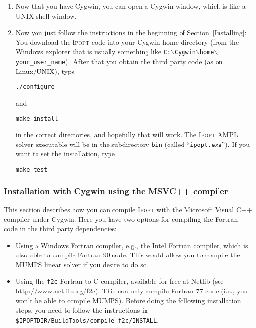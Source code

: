 \documentclass[10pt]{article}
\newcommand{\Ipopt}{\textsc{Ipopt}\xspace}
\begin{document}
\begin{enumerate}
\item Now that you have Cygwin, you can open a Cygwin window, which is
  like a UNIX shell window.

\item\label{it:cyg_inst} Now you just follow the instructions in the
  beginning of Section~\ref{Installing}: You download the \Ipopt
  code into your Cygwin home directory (from the Windows explorer that
  is usually something like
  \texttt{C:$\backslash$Cygwin$\backslash$home$\backslash$your\_user\_name}).\
  After that you obtain the third party code (as on Linux/UNIX),
  type

  \texttt{./configure}

  and

  \texttt{make install}

  in the correct directories, and hopefully that will work.  The
  \Ipopt AMPL solver executable will be in the subdirectory
  \texttt{bin} (called ``\texttt{ipopt.exe}'').  If you want to set
  the installation, type

  \texttt{make test}

\end{enumerate}

\subsubsection{Installation with Cygwin using the MSVC++ compiler}
\label{CygwinInstallNative}

This section describes how you can compile \Ipopt with the Microsoft
Visual C++ compiler under Cygwin.  Here you have two options for
compiling the Fortran code in the third party dependencies:

\begin{itemize}
\item Using a Windows Fortran compiler, e.g., the Intel Fortran
  compiler, which is also able to compile Fortran 90 code.  This would
  allow you to compile the MUMPS linear solver if you desire to do so.
\item Using the {\tt f2c} Fortran to C compiler, available for free at
  Netlib (see \url{http://www.netlib.org/f2c}).  This can only compile
  Fortran 77 code (i.e., you won't be able to compile MUMPS).  Before
  doing the following installation steps, you need to follow the
  instructions in\\ {\tt\$IPOPTDIR/BuildTools/compile\_f2c/INSTALL}.
\end{itemize}
\end{document}
